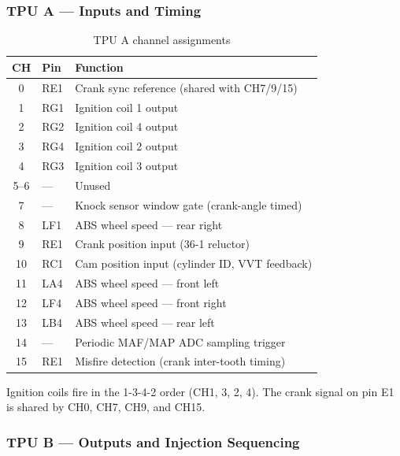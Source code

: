 \documentclass[a4paper,11pt]{article}
\renewcommand{\_}{\oldunderscore\allowbreak}
\begin{document}
\subsubsection*{TPU A --- Inputs and Timing}

\begin{table}[H]
\centering
\begin{tabular}{clp{8.5cm}}
\toprule
\textbf{CH} & \textbf{Pin} & \textbf{Function} \\
\midrule
0  & RE1  & Crank sync reference (shared with CH7/9/15) \\
1  & RG1  & Ignition coil 1 output \\
2  & RG2  & Ignition coil 4 output \\
3  & RG4  & Ignition coil 2 output \\
4  & RG3  & Ignition coil 3 output \\
5--6 & --- & Unused \\
7  & ---  & Knock sensor window gate (crank-angle timed) \\
8  & LF1  & ABS wheel speed --- rear right \\
9  & RE1  & Crank position input (36-1 reluctor) \\
10 & RC1  & Cam position input (cylinder ID, VVT feedback) \\
11 & LA4  & ABS wheel speed --- front left \\
12 & LF4  & ABS wheel speed --- front right \\
13 & LB4  & ABS wheel speed --- rear left \\
14 & ---  & Periodic MAF/MAP ADC sampling trigger \\
15 & RE1  & Misfire detection (crank inter-tooth timing) \\
\bottomrule
\end{tabular}
\caption{TPU A channel assignments}
\end{table}

Ignition coils fire in the 1-3-4-2 order (CH1, 3, 2, 4).
The crank signal on pin E1 is shared by CH0, CH7, CH9, and CH15.

\subsubsection*{TPU B --- Outputs and Injection Sequencing}
\end{document}

